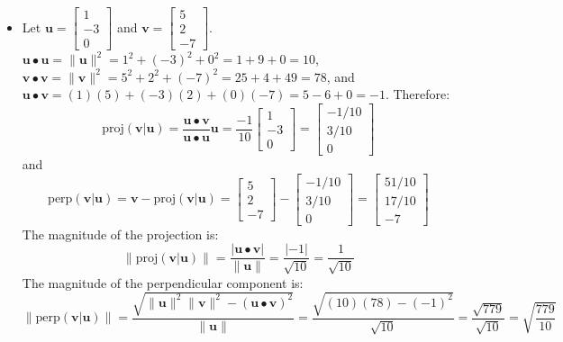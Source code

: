 \documentclass{article}
\begin{document}
\begin{itemize}
\item Let \(\mathbf{u} = \begin{bmatrix} 1 \\ -3 \\ 0 \end{bmatrix}\) and \(\mathbf{v} = \begin{bmatrix} 5 \\ 2 \\ -7 \end{bmatrix}\). \\
\(\mathbf{u} \bullet \mathbf{u} = \|\mathbf{u}\|^2 = 1^2 + (-3)^2 + 0^2 = 1 + 9 + 0 = 10\), \\
\(\mathbf{v} \bullet \mathbf{v} = \|\mathbf{v}\|^2 = 5^2 + 2^2 + (-7)^2 = 25 + 4 + 49 = 78\), and \\
\(\mathbf{u} \bullet \mathbf{v} = (1)(5) + (-3)(2) + (0)(-7) = 5 - 6 + 0 = -1\). Therefore: 
\[\text{proj}(\mathbf{v}|\mathbf{u}) = \frac{\mathbf{u} \bullet \mathbf{v}}{\mathbf{u} \bullet \mathbf{u}}\mathbf{u} = \frac{-1}{10}\begin{bmatrix} 1 \\ -3 \\ 0 \end{bmatrix} = \begin{bmatrix} -1/10 \\ 3/10 \\ 0 \end{bmatrix}\]  
and 
\[\text{perp}(\mathbf{v}|\mathbf{u}) = \mathbf{v} - \text{proj}(\mathbf{v}|\mathbf{u}) = \begin{bmatrix} 5 \\ 2 \\ -7 \end{bmatrix} - \begin{bmatrix} -1/10 \\ 3/10 \\ 0 \end{bmatrix} = \begin{bmatrix} 51/10 \\ 17/10 \\ -7 \end{bmatrix}\]
The magnitude of the projection is:
\[\|\text{proj}(\mathbf{v}|\mathbf{u})\| = \frac{|\mathbf{u} \bullet \mathbf{v}|}{\|\mathbf{u}\|} = \frac{|-1|}{\sqrt{10}} = \frac{1}{\sqrt{10}}\]
The magnitude of the perpendicular component is:
\[\|\text{perp}(\mathbf{v}|\mathbf{u})\| = \frac{\sqrt{\|\mathbf{u}\|^2\|\mathbf{v}\|^2 - (\mathbf{u} \bullet \mathbf{v})^2}}{\|\mathbf{u}\|} = \frac{\sqrt{(10)(78) - (-1)^2}}{\sqrt{10}} = \frac{\sqrt{779}}{\sqrt{10}} = \sqrt{\frac{779}{10}}\]
\end{itemize}

\end{document}
